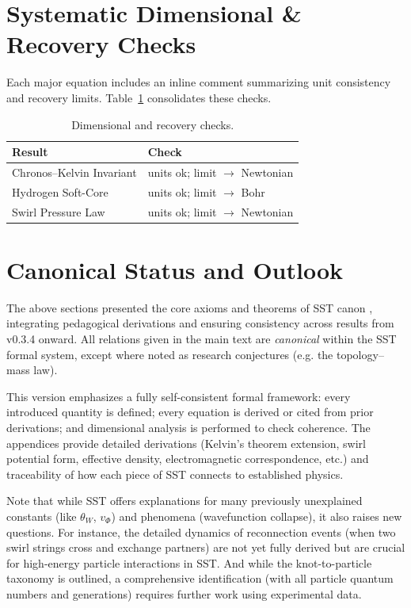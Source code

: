 \documentclass[reprint,aps,onecolumn,nofootinbib]{revtex4-2}
\begin{document}
    \section{Systematic Dimensional \& Recovery Checks}
    \label{canon58:checks}
    Each major equation includes an inline comment summarizing unit consistency and recovery limits. Table~\ref{canon58:check-table} consolidates these checks.
    \begin{table}[h]
    \centering
    \begin{tabular}{l l}
    Result & Check \\ \hline
    Chronos--Kelvin Invariant & units ok; limit $\to$ Newtonian \\
    Hydrogen Soft-Core & units ok; limit $\to$ Bohr \\
    Swirl Pressure Law & units ok; limit $\to$ Newtonian \\
    \end{tabular}
    \caption{Dimensional and recovery checks.}
    \label{canon58:check-table}
    \end{table}


	\section{Canonical Status and Outlook}
	The above sections presented the core axioms and theorems of SST canon \canonversion, integrating pedagogical derivations and ensuring consistency across results from v0.3.4 onward. All relations given in the main text are \emph{canonical} within the SST formal system, except where noted as research conjectures (e.g. the topology–mass law).

	This version emphasizes a fully self-consistent formal framework: every introduced quantity is defined; every equation is derived or cited from prior derivations; and dimensional analysis is performed to check coherence. The appendices provide detailed derivations (Kelvin’s theorem extension, swirl potential form, effective density, electromagnetic correspondence, etc.) and traceability of how each piece of SST connects to established physics.

	Note that while SST offers explanations for many previously unexplained constants (like $\theta_W$, $v_{\Phi}$) and phenomena (wavefunction collapse), it also raises new questions. For instance, the detailed dynamics of reconnection events (when two swirl strings cross and exchange partners) are not yet fully derived but are crucial for high-energy particle interactions in SST. And while the knot-to-particle taxonomy is outlined, a comprehensive identification (with all particle quantum numbers and generations) requires further work using experimental data.
\end{document}
